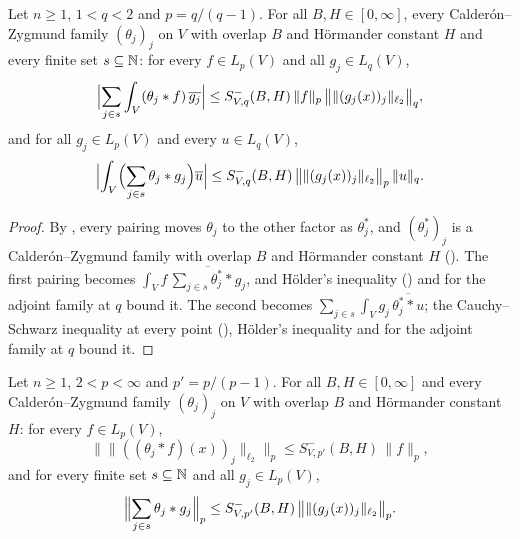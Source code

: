 \begin{lemma}
\label{lem:cz-pairings-adjoint}
\leanok
{}
Let $n \geq 1$, $1 < q < 2$ and $p = q/(q - 1)$. For all $B, H \in [0, \infty]$, every
Calder\'on--Zygmund family $(\theta_j)_j$ on $V$ with overlap $B$ and H\"ormander constant $H$
and every finite set $s \subseteq \mathbb{N}$: for every $f \in L_p(V)$ and all $g_j \in L_q(V)$,
\[
  \Bigl| \sum_{j \in s} \int_V (\theta_j * f) \, \overline{g_j} \Bigr|
  \leq S^-_{V,q}(B, H) \, \|f\|_p \, \bigl\| \|(g_j(x))_j\|_{\ell_2} \bigr\|_q ,
\]
and for all $g_j \in L_p(V)$ and every $u \in L_q(V)$,
\[
  \Bigl| \int_V \Bigl(\sum_{j \in s} \theta_j * g_j\Bigr) \overline u \Bigr|
  \leq S^-_{V,q}(B, H) \, \bigl\| \|(g_j(x))_j\|_{\ell_2} \bigr\|_p \, \|u\|_q .
\]
\end{lemma}

\begin{proof}
\leanok
By , every pairing moves $\theta_j$ to the other factor as
$\theta_j^*$, and $(\theta_j^*)_j$ is a Calder\'on--Zygmund family with overlap $B$ and
H\"ormander constant $H$ (). The first pairing becomes
$\int_V f \, \overline{\sum_{j \in s} \theta_j^* * g_j}$, and H\"older's inequality
() and  for the adjoint family
at $q$ bound it. The second becomes
$\sum_{j \in s} \int_V g_j \, \overline{\theta_j^* * u}$; the Cauchy--Schwarz inequality at
every point (), H\"older's inequality and
 for the adjoint family at $q$ bound it.
\end{proof}

\begin{theorem}
\label{thm:cz-above-two}
\leanok
{}
Let $n \geq 1$, $2 < p < \infty$ and $p' = p/(p - 1)$. For all $B, H \in [0, \infty]$ and every
Calder\'on--Zygmund family $(\theta_j)_j$ on $V$ with overlap $B$ and H\"ormander constant $H$:
for every $f \in L_p(V)$,
\[
  \bigl\| \|((\theta_j * f)(x))_j\|_{\ell_2} \bigr\|_p \leq S^-_{V,p'}(B, H) \, \|f\|_p ,
\]
and for every finite set $s \subseteq \mathbb{N}$ and all $g_j \in L_p(V)$,
\[
  \Bigl\| \sum_{j \in s} \theta_j * g_j \Bigr\|_p
  \leq S^-_{V,p'}(B, H) \, \bigl\| \|(g_j(x))_j\|_{\ell_2} \bigr\|_p .
\]
\end{theorem}

